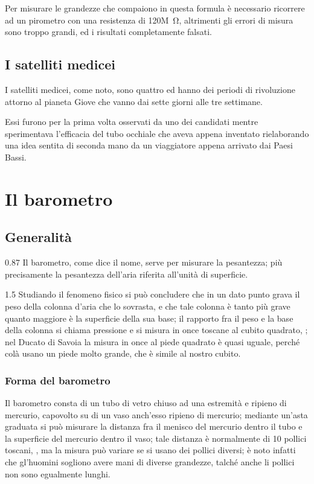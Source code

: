 \documentclass[%
    corpo=13pt,
    twoside,
    oldstyle,
    autoretitolo,
    greek,
    evenboxes,
    nocenterfolio,
    nocenterhead,
]{toptesi}
\begin{document}
Per misurare le grandezze che compaiono in questa formula \`e necessario
ricorrere ad un pirometro con una resistenza di 120\unit{M\ohm}, altrimenti gli
errori di misura sono troppo grandi, ed i risultati completamente falsati.

\section{I satelliti medicei}
I satelliti medicei, come noto, sono quattro ed hanno dei periodi di rivoluzione
attorno al pianeta Giove che vanno dai sette giorni alle tre settimane.

Essi furono per la prima volta osservati da uno dei candidati mentre
sperimentava l'efficacia del tubo occhiale che aveva appena inventato
rielaborando una idea sentita di seconda mano da un viaggiatore appena arrivato
dai Paesi Bassi.





\chapter{Il barometro}
\section{Generalit\`a}
\begin{interlinea}{0.87} Il barometro, come dice il nome, serve per
misurare la pesantezza; pi\`u precisamente la pesantezza dell'aria
riferita all'unit\`a di superficie.
\end{interlinea}

\begin{interlinea}{1.5} Studiando il fenomeno fisico si pu\`o concludere
che in un dato punto grava il peso della colonna d'aria che lo
sovrasta, e che tale colonna \`e tanto pi\`u grave quanto maggiore
\`e la superficie della sua base; il rapporto fra il peso e la base
della colonna si chiama pressione e si misura in once toscane al cubito
quadrato, \cite{tor1}; nel Ducato di Savoia la misura in once al piede
quadrato \`e quasi uguale, perch\'e col\`a usano un piede molto
grande, che \`e simile al nostro cubito.
\end{interlinea}

\subsection{Forma del barometro}
Il barometro consta di un tubo di vetro chiuso ad una estremit\`a e
ripieno di mercurio, capovolto su di un vaso anch'esso ripieno di
mercurio; mediante un'asta graduata si pu\`o misurare la distanza fra
il menisco del mercurio dentro il tubo e la superficie del mercurio
dentro il vaso; tale distanza \`e normalmente di 10 pollici toscani,
\cite{tor1,tor2}, ma la misura pu\`o variare se si usano dei pollici
diversi; \`e noto infatti che gl'huomini sogliono avere mani di
diverse grandezze, talch\'e anche li pollici non sono egualmente
lunghi.
\end{document}

